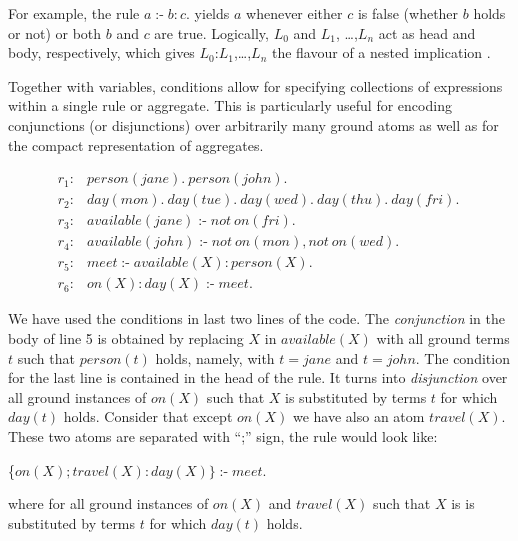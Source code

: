 \documentclass[14pt,a4paper, titlepage]{article}
\DeclareMathOperator{\leftimpl}{:-}
\begin{document}
For example, the rule $\mathit{a \leftimpl b : c.}$ yields 
$a$ whenever either $c$ is false (whether $b$ holds or not) 
or both $b$ and $c$ are true. Logically, $L_0$ and $L_1$,
\dots,$L_n$ act as head and body, respectively, which gives 
$L_0$:$L_1$,\dots,$L_n$ the flavour of a nested implication 
\cite{pott}.

Together  with variables, conditions allow for specifying 
collections of expressions within a single rule or 
aggregate. This is particularly useful for encoding 
conjunctions (or disjunctions) over arbitrarily many ground 
atoms as well as for the compact representation of 
aggregates. 
\begin{exmp}
\begin{align*}
r_1\colon& \mathit{person}(\mathit{jane}). \  \mathit{person}
(\mathit{john}).\\
r_2\colon& \mathit{day}(\mathit{mon}). \ \mathit{day}
(\mathit{tue}). \ \mathit{day}(\mathit{wed}). \ \mathit{day}
(\mathit{thu}). \ \mathit{day}(\mathit{fri}). \ \\
r_3\colon& \mathit{available}(\mathit{jane}) \leftimpl not \  
\mathit{on}(\mathit{fri}).\\
r_4\colon& \mathit{available}(\mathit{john}) \leftimpl 
\mathit{not} \ \mathit{on}(\mathit{mon}), \mathit{not} \ 
\mathit{on}(\mathit{wed}).\\
r_5\colon& \mathit{meet} \leftimpl \mathit{available}(X) : 
\mathit{person}(X).\\
r_6\colon& \mathit{on}(X) : \mathit{day}(X) \leftimpl 
\mathit{meet}.
\end{align*}
\end{exmp}  
We have used the conditions in last two lines of the code. 
The \emph{conjunction} in the body of line 5 is obtained by 
replacing $X$ in $\mathit{available(X)}$ with all ground 
terms $t$ such that $\mathit{person(t)}$ holds, namely, 
with $\mathit{t=jane}$ and $\mathit{t=john}$. The condition 
for the last line is contained in the head of the rule. It 
turns into \emph{disjunction} over all ground instances of 
$\mathit{on(X)}$ such that $X$ is substituted by terms $t$ 
for which $\mathit{day(t)}$ holds. Consider that except $\mathit{on(X)}$ we have also an atom $\mathit{travel(X)}$. These two atoms are separated with ``;'' sign, the rule would look like:
\centerline{\{$\mathit{on}(X);\mathit{travel}(X) : \mathit{day}(X)\} \leftimpl 
\mathit{meet}.$}
where for all ground instances of $\mathit{on(X)}$ and $\mathit{travel(X)}$ such that $X$ is is substituted by terms $t$ for which $\mathit{day(t)}$ holds. 
\end{document}
